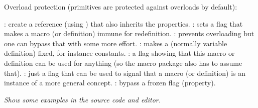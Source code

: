 Overload protection (primitives are protected against overloads by default):

\startitemize
    \startitem
        \type {\aliased}: create a reference (using \type {\let}) that also inherits the
        properties.
    \stopitem
    \startitem
        \type {\permanent}: sets a flag that makes a macro (or definition) immune for
        redefinition.
    \stopitem
    \startitem
        \type {\frozen}: prevents overloading but one can bypass that with some
        more effort.
    \stopitem
    \startitem
        \type {\immutable}: makes a (normally variable definition) fixed, for instance
        constants.
    \stopitem
    \startitem
        \type {\mutable}: a flag showing that this macro or definition can be used for
        anything (so the macro package also has to assume that).
    \stopitem
    \startitem
        \type {\instance}: just a flag that can be used to signal that a macro (or definition)
        is an instance of a more general concept.
    \stopitem
    \startitem
        \type {\overloaded}: bypass a frozen flag (property).
    \stopitem
\stopitemize

\blank[2*big]

{\em Show some examples in the source code and editor.}

\stoptitle

\stopdocument
